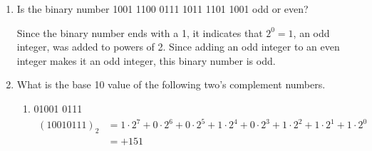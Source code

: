 \documentclass[12pt]{article}
\begin{document}
\begin{enumerate}
    And converting the decimals to binary,
    \begin{align*}
      74 &= \intlongdivision{74}{2}\quad
      \intlongdivision{37}{2}\quad
      \intlongdivision{18}{2}\quad
      \intlongdivision{9}{2}\quad
      \intlongdivision{4}{2}\quad
      \intlongdivision{2}{2}\quad
      \intlongdivision{1}{2}\\
      &\Rightarrow (0100 \ 1010)_2 \\
      97 &= (0110 \ 0001)_2 \ \text{(from part 1B)} \\
      118 &= \intlongdivision{118}{2}\quad
      \intlongdivision{59}{2}\quad
      \intlongdivision{29}{2}\quad
      \intlongdivision{14}{2}\quad
      \intlongdivision{7}{2}\quad
      \intlongdivision{3}{2}\quad
      \intlongdivision{1}{2}\\
      &\Rightarrow (0111 \ 0110)_2 \\
      46 &= \intlongdivision{46}{2}\quad
      \intlongdivision{23}{2}\quad
      \intlongdivision{11}{2}\quad
      \intlongdivision{5}{2}\quad
      \intlongdivision{2}{2}\quad
      \intlongdivision{1}{2}\\
      &\Rightarrow (0010 \ 1110)_2 \\
      50 &= \intlongdivision{50}{2}\quad
      \intlongdivision{25}{2}\quad
      \intlongdivision{12}{2}\quad
      \intlongdivision{6}{2}\quad
      \intlongdivision{3}{2}\quad
      \intlongdivision{1}{2}\\
      &\Rightarrow (0011 \ 0010)_2 \\
    \end{align*}
    Therefore, the ASCII string ``Java.2'' converted to binary is
    \begin{equation*}
      (01001010 \ 01100001 \ 01110110 \ 01100001 \ 00101110 \ 00110010)_2
    \end{equation*}

    \item Is the binary number 1001 1100 0111 1011 1101 1001 odd or even?

    Since the binary number ends with a 1, it indicates that $2^0=1$, an odd integer, was added to powers of 2. Since adding an odd integer to an even integer makes it an odd integer, this binary number is odd.

    \item What is the base 10 value of the following two’s complement numbers.
    \begin{enumerate}
      \item 01001 0111
      \begin{align*}
        (1001 0111)_2 &= 1 \cdot 2^7 + 0 \cdot 2^6 + 0 \cdot 2^5 + 1 \cdot 2^4 + 0 \cdot 2^3 + 1 \cdot 2^2 + 1 \cdot 2^1 + 1 \cdot 2^0 \\
        &= +151
      \end{align*}


\end{enumerate}
\end{enumerate}
\end{document}
